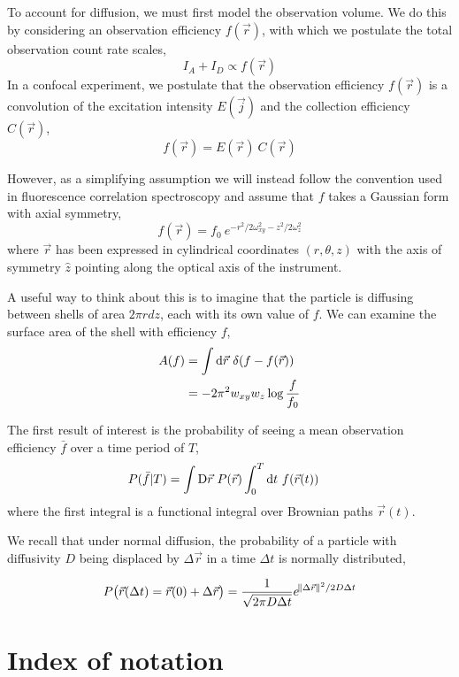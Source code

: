 \documentclass{article}
\begin{document}
To account for diffusion, we must first model the observation
volume. We do this by considering an observation efficiency $f(\vec
r)$, with which we postulate the total observation count rate scales,
\[ I_A + I_D \propto f(\vec r) \]
In a confocal experiment, we postulate that the observation efficiency
$f(\vec r)$ is a convolution of the excitation intensity $E(\vec j)$
and the collection efficiency $C(\vec r)$,
\[ f(\vec r) = E(\vec r) ~ C(\vec r) \]

However, as a simplifying assumption we will instead follow the
convention used in fluorescence correlation
spectroscopy\cite{Magde1972} and assume that $f$ takes a Gaussian form
with axial symmetry,
\[ f(\vec r) = f_0 ~ e^{- r^2 / 2 \omega_{xy}^2 - z^2 / 2 \omega_z^2} \]
where $\vec r$ has been expressed in cylindrical coordinates
$(r,\theta,z)$ with the axis of symmetry $\hat z$ pointing along the
optical axis of the instrument.

A useful way to think about this is to imagine that the particle is
diffusing between shells of area $2\pi r dz$, each with its own value
of $f$. We can examine the surface area of the shell with efficiency $f$,
\begin{align*}
  A(f) & = \int \dif\vec{r}~ \delta(f - f(\vec r)) \\
  & = -2\pi^2 w_{xy} w_z \log\frac{f}{f_0}
\end{align*}

The first result of interest is the probability of seeing a mean
observation efficiency $\bar f$ over a time period of $T$,
\begin{align*}
  P(\bar f \vert T) & = \int \Dif\vec{r}~ P(\vec{r}) \int_0^T \dif t~ f(\vec{r}(t))
\end{align*}
where the first integral is a functional integral over Brownian paths
$\vec r(t)$.

We recall that under normal diffusion, the probability of a particle
with diffusivity $D$ being displaced by $\Delta \vec{r}$ in a time
$\Delta t$ is normally distributed,

\[
  P\big( \vec{r}(\Delta t) = \vec{r}(0) + \Delta \vec{r} \big) =
  \frac{1}{\sqrt{2\pi D \Delta t}}
  e^{\norm{\Delta \vec{r}}^2 / 2 D \Delta t}
\] 

\section{Index of notation}
\end{document}
